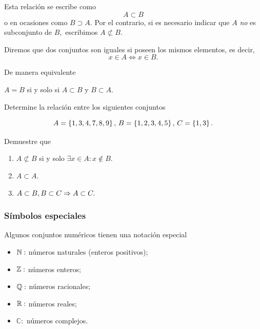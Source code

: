 \documentclass[xcolor={svgnames},
  hyperref={colorlinks}, 
  spanish, 12pt]{beamer}
\numberwithin{equation}{section} %
\numberwithin{figure}{section} %
\begin{document}
\begin{frame}
 Esta relaci\'on se escribe como
 $$
 A \subset B 
 $$ o en ocasiones como
 $B\supset A.$ \pause Por el contrario, si es necesario indicar que $A$ \emph{no} es  subconjunto de $B,$ escribimos $A \not\subset B.$
\end{frame}

\begin{frame}
 Diremos que dos conjuntos son iguales si poseen los mismos elementos, es decir, 
 $$
 x \in A \iff x \in B.
 $$
\end{frame}

\begin{frame}
 De manera equivalente 
 \begin{center}
  $A=B$ si y solo si $A \subset B$ y $B \subset A.$
 \end{center}

\end{frame}

\begin{frame}
 \begin{exmp}
  \label{lip:exmp:1.2}
  Determine la relaci\'on entre los siguientes conjuntos
  \begin{center}
   $$A=\left\{ 1,3,4,7,8,9 \right\}, \, 
   B=\left\{ 1,2,3,4,5 \right\}, \,
   C=\left\{ 1,3 \right\}.$$
  \end{center}

 \end{exmp}

\end{frame}

\begin{frame}
 \begin{exmp}
  Demuestre que 
  \begin{enumerate}
   \item $A\not\subset B$ si y solo $\exists x\in A: x\notin B.$
   \item $A \subset A.$
   \item $A\subset B, B\subset C \Rightarrow  A\subset C.$
  \end{enumerate}

 \end{exmp}

\end{frame}

\subsubsection{S\'imbolos especiales}

\begin{frame} Algunos conjuntos num\'ericos tienen una notaci\'on especial
 \begin{itemize}
  \item $\mathbb{N}:$ n\'umeros naturales (enteros positivos); \pause
  \item $\mathbb{Z}:$ n\'umeros enteros; \pause
  \item $\mathbb{Q}:$ n\'umeros racionales; \pause
  \item $\mathbb{R}:$ n\'umeros reales; \pause
  \item $\mathbb{C}:$ n\'umeros complejos.
 \end{itemize}
\pause

\end{frame}
\end{document}
